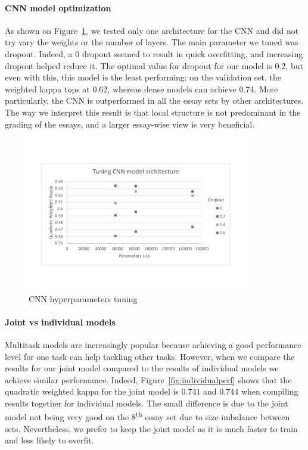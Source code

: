 \documentclass[a4paper,12pt,english]{article}
\begin{document}
\paragraph{CNN model optimization}
As shown on Figure~\ref{fig:optcnn}, we tested only one architecture for the CNN and did not try vary the weights or the number of layers. The main parameter we tuned was dropout. Indeed, a 0 dropout seemed to result in quick overfitting, and increasing dropout helped reduce it. The optimal value for dropout for our model is $0.2$, but even with this, this model is the least performing: on the validation set, the weighted kappa tops at 0.62, whereas dense models can achieve 0.74. More particularly, the CNN is outperformed in all the essay sets by other architectures. The way we interpret this result is that local structure is not predominant in the grading of the essays, and a larger essay-wise view is very beneficial.
\begin{figure}[h]
\vspace*{-1.5cm}
\centering
\includegraphics[width=0.85\textwidth]{fig/tune_cnn_arch.pdf}
\vspace*{-1.5cm}
\caption{CNN hyperparameters tuning}
\label{fig:optcnn}
\vspace*{-1cm}
\end{figure}


\paragraph{Joint vs individual models} Multitask models are increasingly popular because achieving a good performance level for one task can help tackling other tasks. However, when we compare the results for our joint model compared to the results of individual models we achieve similar performance. Indeed, Figure~\ref{fig:individualperf} shows that the quadratic weighted kappa for the joint model is $0.741$ and $0.744$ when compiling results together for individual models. The small difference is due to the joint model not being very good on the $8$\textsuperscript{th} essay set due to size imbalance between sets. Nevertheless, we prefer to keep the joint model as it is much faster to train and less likely to overfit.
\end{document}
